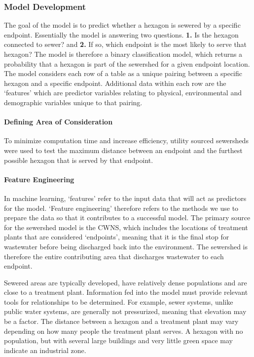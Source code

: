 \documentclass[
  letterpaper,
  DIV=11,
  numbers=noendperiod]{scrartcl}
\let\oldparagraph\paragraph
\renewcommand{\paragraph}[1]{\oldparagraph{#1}\mbox{}}
\begin{document}
\subsubsection{Model Development}\label{model-development}

The goal of the model is to predict whether a hexagon is sewered by a
specific endpoint. Essentially the model is answering two questions.
\textbf{1.} Is the hexagon connected to sewer? and \textbf{2.} If so,
which endpoint is the most likely to serve that hexagon? The model is
therefore a binary classification model, which returns a probability
that a hexagon is part of the sewershed for a given endpoint location.
The model considers each row of a table as a unique pairing between a
specific hexagon and a specific endpoint. Additional data within each
row are the `features' which are predictor variables relating to
physical, environmental and demographic variables unique to that
pairing.

\paragraph{Defining Area of
Consideration}\label{defining-area-of-consideration}

To minimize computation time and increase efficiency, utility sourced
sewersheds were used to test the maximum distance between an endpoint
and the furthest possible hexagon that is served by that endpoint.

\paragraph{Feature Engineering}\label{feature-engineering}

In machine learning, `features' refer to the input data that will act as
predictors for the model. `Feature engineering' therefore refers to the
methods we use to prepare the data so that it contributes to a
successful model. The primary source for the sewershed model is the
CWNS, which includes the locations of treatment plants that are
considered `endpoints', meaning that it is the final stop for wastewater
before being discharged back into the environment. The sewershed is
therefore the entire contributing area that discharges wastewater to
each endpoint.

Sewered areas are typically developed, have relatively dense populations
and are close to a treatment plant. Information fed into the model must
provide relevant tools for relationships to be determined. For example,
sewer systems, unlike public water systems, are generally not
pressurized, meaning that elevation may be a factor. The distance
between a hexagon and a treatment plant may vary depending on how many
people the treatment plant serves. A hexagon with no population, but
with several large buildings and very little green space may indicate an
industrial zone.
\end{document}
